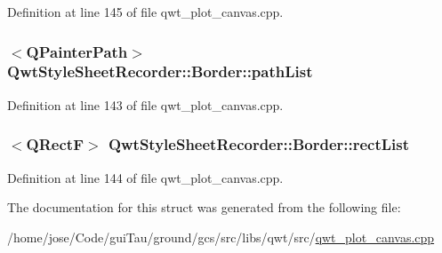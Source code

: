 Definition at line 145 of file qwt\-\_\-plot\-\_\-canvas.\-cpp.

\hypertarget{struct_qwt_style_sheet_recorder_1_1_border_a638e43af38697755dfd944f7083c4761}{
\subsubsection[{path\-List}]{$<$Q\-Painter\-Path$>$ Qwt\-Style\-Sheet\-Recorder\-::\-Border\-::path\-List}}\label{struct_qwt_style_sheet_recorder_1_1_border_a638e43af38697755dfd944f7083c4761}


Definition at line 143 of file qwt\-\_\-plot\-\_\-canvas.\-cpp.

\hypertarget{struct_qwt_style_sheet_recorder_1_1_border_a4a03e9d8c30c6ec671e7dadc9745789b}{
\subsubsection[{rect\-List}]{$<$Q\-Rect\-F$>$ Qwt\-Style\-Sheet\-Recorder\-::\-Border\-::rect\-List}}\label{struct_qwt_style_sheet_recorder_1_1_border_a4a03e9d8c30c6ec671e7dadc9745789b}


Definition at line 144 of file qwt\-\_\-plot\-\_\-canvas.\-cpp.



The documentation for this struct was generated from the following file\-:\begin{DoxyCompactItemize}
\item 
/home/jose/\-Code/gui\-Tau/ground/gcs/src/libs/qwt/src/\hyperlink{qwt__plot__canvas_8cpp}{qwt\-\_\-plot\-\_\-canvas.\-cpp}\end{DoxyCompactItemize}
